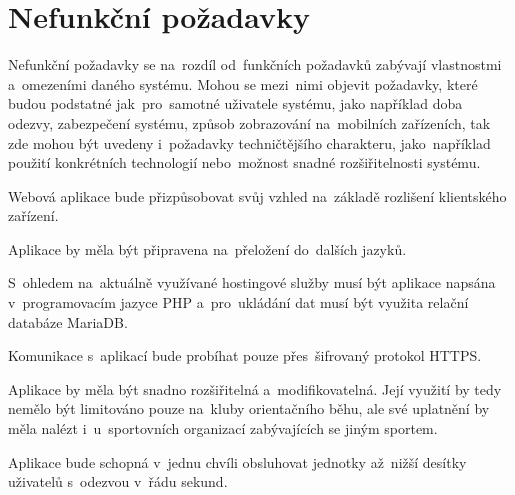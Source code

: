 \section{Nefunkční požadavky}
Nefunkční požadavky se na~rozdíl od~funkčních požadavků zabývají vlastnostmi a~omezeními daného systému. Mohou se mezi~nimi objevit požadavky, které budou podstatné jak~pro~samotné uživatele systému, jako například doba odezvy, zabezpečení systému, způsob zobrazování na~mobilních zařízeních, tak zde mohou být uvedeny i~požadavky techničtějšího charakteru, jako~například použití konkrétních technologií nebo~možnost snadné rozšiřitelnosti systému. \cite{requirements}

\begin{enumerate}[label=\textcolor{decoration}{\textbf{N\arabic*}}, leftmargin=7mm]
	Webová aplikace bude přizpůsobovat svůj vzhled na~základě rozlišení klientského zařízení.

	Aplikace by měla být připravena na~přeložení do~dalších jazyků.

	S~ohledem na~aktuálně využívané hostingové služby musí být aplikace napsána v~programovacím jazyce PHP a~pro~ukládání dat musí být využita relační databáze MariaDB.

	Komunikace s~aplikací bude probíhat pouze přes~šifrovaný protokol HTTPS.

	Aplikace by měla být snadno rozšiřitelná a~modifikovatelná. Její využití by tedy nemělo být limitováno pouze na~kluby orientačního běhu, ale své uplatnění by měla nalézt i~u~sportovních organizací zabývajících se jiným sportem.

	Aplikace bude schopná v~jednu chvíli obsluhovat jednotky až~nižší desítky uživatelů s~odezvou v~řádu sekund.
\end{enumerate}
